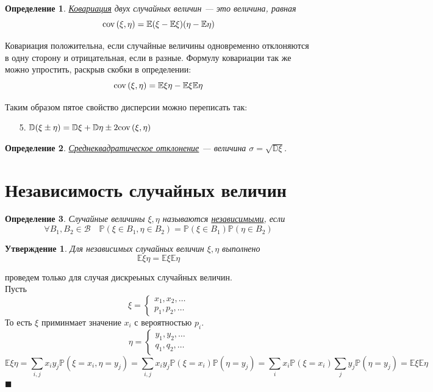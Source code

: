 \documentclass[12pt]{article}
\newtheorem{Def}{Определение}
\newtheorem{St}{Утверждение}
\newenvironment{Proof}{\par\noindent{\bf Доказательство}}{$\blacksquare$}
\numberwithin{Th}{section}
\numberwithin{Def}{section}
\numberwithin{Lem}{section}
\numberwithin{St}{section}
\numberwithin{equation}{section}
\newcommand\Pro{\mathbb{P}} %
\newcommand\Bor{\mathscr{B}} %
\newcommand\Expec{\mathbb{E}} %
\newcommand\Disp{\mathbb{D}}  %
\newcommand\Cov{{\rm cov \,}} %
\begin{document}
\begin{Def}
\underline{Ковариация} двух случайных величин --- это величина, равная
$$ \Cov(\xi,\eta) = \Expec(\xi - \Expec\xi)(\eta - \Expec\eta)$$
\end{Def}

Ковариация положительна, если случайные величины одновременно отклоняются в одну сторону и отрицательная, если в разные. Формулу ковариации так же можно упростить, раскрыв скобки в определении:
$$\Cov(\xi,\eta) = \Expec\xi\eta - \Expec\xi\Expec\eta$$

Таким образом пятое свойство дисперсии можно переписать так:
\begin{itemize}
	\item[5.] $\Disp(\xi \pm \eta) = \Disp\xi + \Disp\eta \pm 2\Cov(\xi,\eta)$
\end{itemize}

\begin{Def}
\underline{Среднеквадратическое отклонение} --- величина $\sigma = \sqrt{\Disp\xi}$.
\end{Def}



\newpage
\section{Независимость случайных величин}
\begin{Def}
	Случайные величины $\xi, \eta$ называются \underline{независимыми}, если 
	 $$ \forall B_1, B_2 \in \Bor \quad \Pro(\xi \in B_1, \eta \in B_2) = \Pro(\xi \in B_1)\Pro(\eta \in B_2) $$
\end{Def}

\begin{St}
Для независимых случайных величин $\xi, \eta$ выполнено
$$\Expec\xi\eta = \Expec\xi\Expec\eta$$
\end{St}
\begin{Proof}
проведем только для случая дискреьных случайных величин.\\
Пусть 
\[
   	\xi = 
  	\begin{cases}
  		x_1, x_2, \ldots \\
  		p_1, p_2, \ldots
  	\end{cases}
  \]
  То есть $\xi$ приминмает значение $x_i$ с вероятностью $p_i$.
  \[
   	\eta = 
  	\begin{cases}
  		y_1, y_2, \ldots \\
  		q_1, q_2, \ldots
  	\end{cases}
  \]
  $$\Expec\xi\eta=\sum\limits_{i,j} x_iy_j\Pro(\xi=x_i, \eta=y_j) = \sum\limits_{i,j} x_iy_j\Pro(\xi=x_i)\Pro(\eta=y_j) =  \sum\limits_{i} x_i\Pro(\xi=x_i)\sum\limits_j y_j\Pro(\eta=y_j) = \Expec\xi\Expec\eta$$
\end{Proof}
\end{document}
